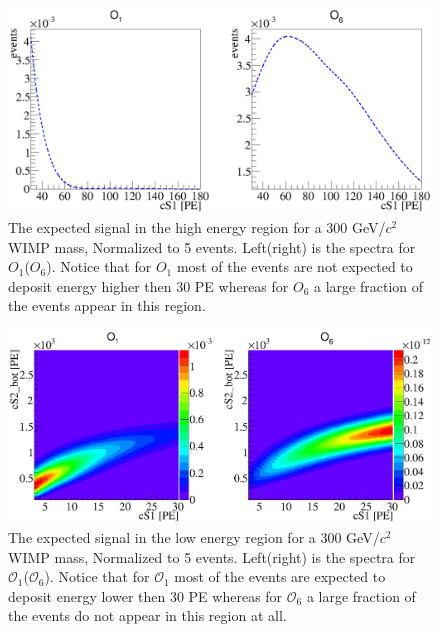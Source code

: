 \begin{figure}[h!]
\begin{minipage}{1.\linewidth}
\centerline{\includegraphics[width=1.\linewidth]{Figures/SigHighO1O6.eps}}
\end{minipage}
\caption{The expected signal in the high energy region for a 300 GeV/$c^2$ WIMP mass, Normalized to 5 events. Left(right) is the spectra for $O_1$($O_6$). Notice that for $O_1$ most of the events are not expected to deposit energy higher then 30 PE whereas for $O_6$ a large fraction of the events appear in this region.}
\label{fig:HighE}
\end{figure} 

\begin{figure}[h!]
\begin{minipage}{1.\linewidth}
\centerline{\includegraphics[width=1.\linewidth]{Figures/SigLowO1O6.eps}}
\end{minipage}
\caption{The expected signal in the low energy region for a 300 GeV/$c^2$ WIMP mass, Normalized to 5 events. Left(right) is the spectra for $\mathcal{O}_1$($\mathcal{O}_6$). Notice that for $\mathcal{O}_1$ most of the events are expected to deposit energy lower then 30 PE whereas for $\mathcal{O}_6$ a large fraction of the events do not appear in this region at all.}
\label{fig:LowE}
\end{figure}




